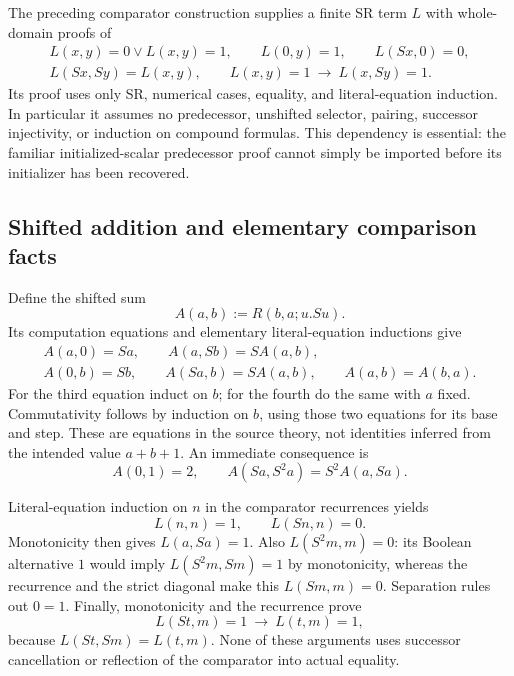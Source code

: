 The preceding comparator construction supplies a finite SR term $L$
with whole-domain proofs of
\[
\begin{gathered}
 L(x,y)=0\vee L(x,y)=1,\qquad
 L(0,y)=1,\qquad L(Sx,0)=0,\\
 L(Sx,Sy)=L(x,y),\qquad
 L(x,y)=1\ \longrightarrow\ L(x,Sy)=1.
\end{gathered}
 \tag{L}\label{eq:sr-comparator-properties}
\]
Its proof uses only SR, numerical cases, equality, and literal-equation
induction.  In particular it assumes no predecessor, unshifted selector,
pairing, successor injectivity, or induction on compound formulas.
This dependency is essential: the familiar initialized-scalar
predecessor proof cannot simply be imported before its initializer has
been recovered.

\subsection{Shifted addition and elementary comparison facts}

Define the shifted sum
\[
                  A(a,b):=R(b,a;u.Su).
\]
Its computation equations and elementary literal-equation inductions give
\[
\begin{gathered}
 A(a,0)=Sa,\qquad A(a,Sb)=S A(a,b),\\
 A(0,b)=Sb,\qquad A(Sa,b)=S A(a,b),\qquad A(a,b)=A(b,a).
\end{gathered}
 \tag{A}\label{eq:sr-shifted-addition}
\]
For the third equation induct on $b$; for the fourth do the same with
$a$ fixed.  Commutativity follows by induction on $b$, using those
two equations for its base and step.  These are equations in the source
theory, not identities inferred from the intended value $a+b+1$.
An immediate consequence is
\[
 A(0,1)=2,\qquad
 A(Sa,S^2a)=S^2A(a,Sa).
 \tag{AD}\label{eq:sr-double-index}
\]

Literal-equation induction on $n$ in the comparator recurrences yields
\[
                 L(n,n)=1,\qquad L(Sn,n)=0.
 \tag{Diagonal}\label{eq:sr-comparison-diagonals}
\]
Monotonicity then gives $L(a,Sa)=1$.
Also $L(S^2m,m)=0$: its Boolean alternative $1$ would imply
$L(S^2m,Sm)=1$ by monotonicity, whereas the recurrence and the strict
diagonal make this $L(Sm,m)=0$.  Separation rules out $0=1$.
Finally, monotonicity and the recurrence prove
\[
           L(St,m)=1\ \longrightarrow\ L(t,m)=1,
 \tag{Down}\label{eq:sr-comparison-down}
\]
because $L(St,Sm)=L(t,m)$.  None of these arguments uses successor
cancellation or reflection of the comparator into actual equality.

